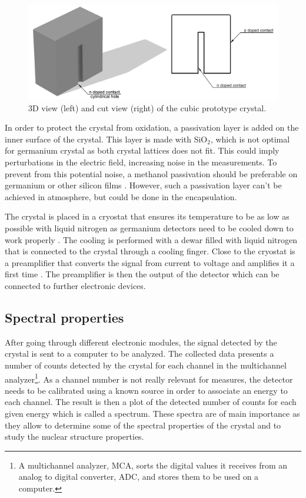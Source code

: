 \documentclass[11pt,a4paper]{article}
\begin{document}
\begin{figure}[!h]
\centering
\includegraphics[scale=0.4]{Crystal.png}
\caption{3D view (left) and cut view (right) of the cubic prototype crystal.}
\label{geo}
\end{figure}

In order to protect the crystal from oxidation, a passivation layer is added on the inner surface of the crystal. This layer is made with SiO$_2$, which is not optimal for germanium crystal as both crystal lattices does not fit. This could imply perturbations in the electric field, increasing noise in the measurements. To prevent from this potential noise, a methanol passivation \cite{Napoli} should be preferable on germanium or other silicon films \cite{Xie}. However, such a passivation layer can't be achieved in atmosphere, but could be done in the encapsulation.

The crystal is placed in a cryostat that ensures its temperature to be as low as possible with liquid nitrogen as germanium detectors need to be cooled down to work properly \cite{Knoll}. The cooling is performed with a dewar filled with liquid nitrogen that is connected to the crystal through a cooling finger. Close to the cryostat is a preamplifier that converts the signal from current to voltage and amplifies it a first time \cite{Tsoulfanidis}. The preamplifier is then the output of the detector which can be connected to further electronic devices.

\subsection{Spectral properties} \label{spectral}

After going through different electronic modules, the signal detected by the crystal is sent to a computer to be analyzed. The collected data presents a number of counts detected by the crystal for each channel in the multichannel analyzer\footnote{A multichannel analyzer, MCA, sorts the digital values it receives from an analog to digital converter, ADC, and stores them to be used on a computer.}. As a channel number is not really relevant for measures, the detector needs to be calibrated using a known source in order to associate an energy to each channel. The result is then a plot of the detected number of counts for each given energy which is called a spectrum. These spectra are of main importance as they allow to determine some of the spectral properties of the crystal and to study the nuclear structure properties.
\end{document}
